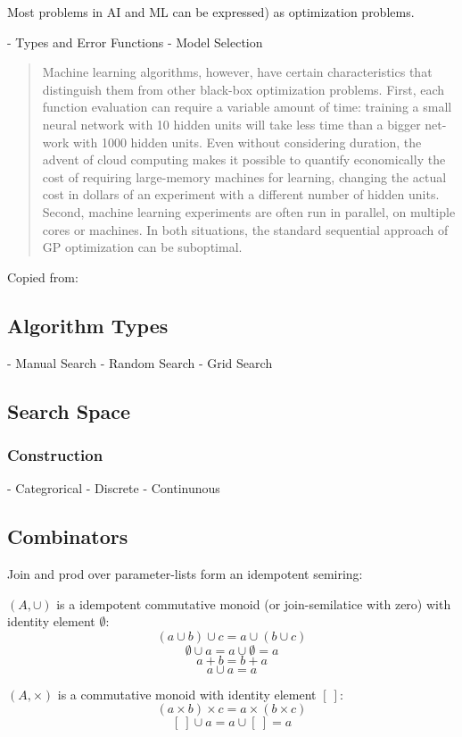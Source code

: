 \documentclass[english]{article}
\begin{document}
Most problems in \ac{AI} and \ac{ML} can be expressed) as
optimization problems.

 - Types and Error Functions
 - Model Selection

\begin{quote}
Machine learning algorithms, however, have certain characteristics that distinguish them from other black-box optimization problems.  First, each function evaluation can require a variable amount of time:  training a small neural network with 10 hidden units will take less time than a bigger net-work with 1000 hidden units.  Even without considering duration, the advent of cloud computing makes it possible to quantify economically the cost of requiring large-memory machines for learning, changing the actual cost in dollars of an experiment with a different number of hidden units.
Second, machine learning experiments are often run in parallel, on multiple cores or machines. In both situations, the standard sequential approach of GP optimization can be suboptimal.
\end{quote}
Copied from: \cite{snoek_practical_2012}

\subsection{Algorithm Types}
 - Manual Search
 - Random Search
 - Grid Search
\subsection{Search Space}
\subsubsection{Construction}
 - Categrorical
 - Discrete
 - Continunous

\subsection{Combinators}
Join and prod over parameter-lists form an idempotent semiring:

$(A, \cup)$ is a idempotent commutative monoid (or join-semilatice with zero) with identity element $\emptyset$:
$$(a \cup b) \cup c = a \cup (b \cup c)$$
$$\emptyset \cup a = a \cup \emptyset = a$$
$$a + b = b + a$$
$$a \cup a = a$$

$(A, \times)$ is a commutative monoid with identity element $[\ ]$:
$$(a \times b) \times c = a \times (b \times c)$$
$$[\ ] \cup a = a \cup [\ ] = a$$
\end{document}

